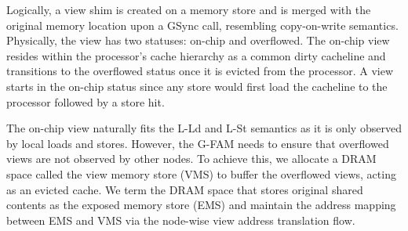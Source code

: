 Logically, a view shim is created on a memory store and is merged with the original memory location upon a GSync call, resembling copy-on-write semantics. 
Physically, the view has two statuses: on-chip and overflowed. The on-chip view resides within the processor's cache hierarchy as a common dirty cacheline and transitions to the overflowed status once it is evicted from the processor. A view starts in the on-chip status since any store would first load the cacheline to the processor followed by a store hit. 

The on-chip view naturally fits the L-Ld and L-St semantics as it is only observed by local loads and stores. However, the G-FAM needs to ensure that overflowed views are not observed by other nodes. To achieve this, we allocate a DRAM space called the view memory store (VMS) to buffer the overflowed views, acting as an evicted cache. We term the DRAM space that stores original shared contents as the exposed memory store (EMS) and maintain the address mapping between EMS and VMS via the node-wise view address translation flow.










